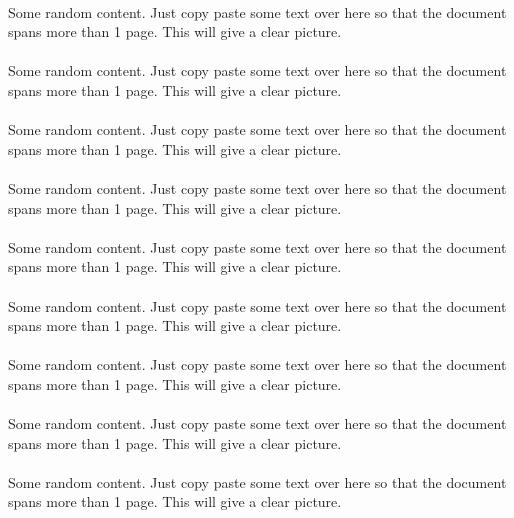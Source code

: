 \documentclass{article}
\begin{document}
    \paragraph{}
	Some random content. Just copy paste some text over here so that the document spans more than 1 page. This will give a clear picture.
    \paragraph{}
	Some random content. Just copy paste some text over here so that the document spans more than 1 page. This will give a clear picture.
    \paragraph{}
	Some random content. Just copy paste some text over here so that the document spans more than 1 page. This will give a clear picture.
    \paragraph{}
	Some random content. Just copy paste some text over here so that the document spans more than 1 page. This will give a clear picture.
    \paragraph{}
	Some random content. Just copy paste some text over here so that the document spans more than 1 page. This will give a clear picture.
    \paragraph{}
	Some random content. Just copy paste some text over here so that the document spans more than 1 page. This will give a clear picture.
    \paragraph{}
	Some random content. Just copy paste some text over here so that the document spans more than 1 page. This will give a clear picture.
    \paragraph{}
	Some random content. Just copy paste some text over here so that the document spans more than 1 page. This will give a clear picture.
    \paragraph{}
	Some random content. Just copy paste some text over here so that the document spans more than 1 page. This will give a clear picture.
\end{document}
